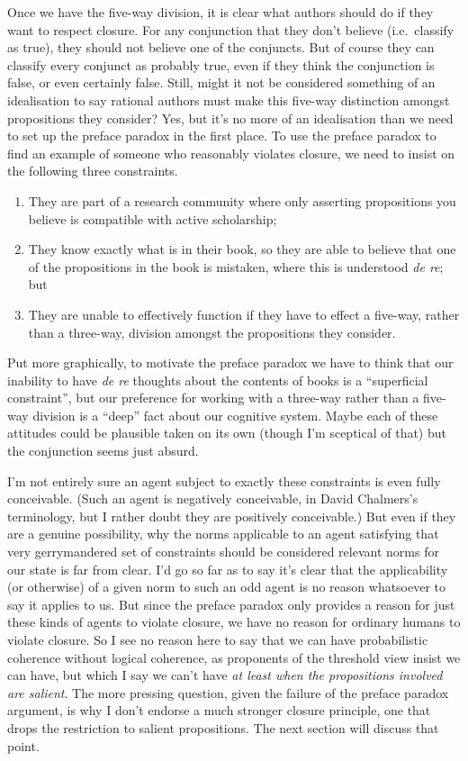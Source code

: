 \documentclass[
  11pt,
  letterpaper,
  DIV=11,
  numbers=noendperiod,
  oneside]{scrartcl}
\begin{document}
Once we have the five-way division, it is clear what authors should do
if they want to respect closure. For any conjunction that they don't
believe (i.e.~classify as true), they should not believe one of the
conjuncts. But of course they can classify every conjunct as probably
true, even if they think the conjunction is false, or even certainly
false. Still, might it not be considered something of an idealisation to
say rational authors must make this five-way distinction amongst
propositions they consider? Yes, but it's no more of an idealisation
than we need to set up the preface paradox in the first place. To use
the preface paradox to find an example of someone who reasonably
violates closure, we need to insist on the following three constraints.

\begin{enumerate}
\def\labelenumi{\arabic{enumi}.}
\item
  They are part of a research community where only asserting
  propositions you believe is compatible with active scholarship;
\item
  They know exactly what is in their book, so they are able to believe
  that one of the propositions in the book is mistaken, where this is
  understood \emph{de re}; but
\item
  They are unable to effectively function if they have to effect a
  five-way, rather than a three-way, division amongst the propositions
  they consider.
\end{enumerate}

Put more graphically, to motivate the preface paradox we have to think
that our inability to have \emph{de re} thoughts about the contents of
books is a ``superficial constraint'', but our preference for working
with a three-way rather than a five-way division is a ``deep'' fact
about our cognitive system. Maybe each of these attitudes could be
plausible taken on its own (though I'm sceptical of that) but the
conjunction seems just absurd.

I'm not entirely sure an agent subject to exactly these constraints is
even fully conceivable. (Such an agent is negatively conceivable, in
David Chalmers's terminology, but I rather doubt they are positively
conceivable.) But even if they are a genuine possibility, why the norms
applicable to an agent satisfying that very gerrymandered set of
constraints should be considered relevant norms for our state is far
from clear. I'd go so far as to say it's clear that the applicability
(or otherwise) of a given norm to such an odd agent is no reason
whatsoever to say it applies to us. But since the preface paradox only
provides a reason for just these kinds of agents to violate closure, we
have no reason for ordinary humans to violate closure. So I see no
reason here to say that we can have probabilistic coherence without
logical coherence, as proponents of the threshold view insist we can
have, but which I say we can't have \emph{at least when the propositions
involved are salient}. The more pressing question, given the failure of
the preface paradox argument, is why I don't endorse a much stronger
closure principle, one that drops the restriction to salient
propositions. The next section will discuss that point.
\end{document}
